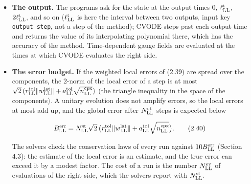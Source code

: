 \documentclass[
  10pt,
]{article}
\begin{document}
\begin{itemize}
  the sum running over the \(n^{\rm cpx}_{\rm LL}\) complex components
  of the state, with the relative tolerance \(r^{\rm tol}_{\rm LL}\) and
  the absolute tolerance \(a^{\rm tol}_{\rm LL}\) (the solvers use
  \(10^{-12}\) and \(10^{-14}\); input keys \texttt{rtol},
  \texttt{atol}). A rejected step is repeated with a smaller
  \(h^{\rm CV}_{\rm LL}\); after every step CVODE chooses the size and
  the order of the next one, as large as the test allows. The factor 2
  appears because SUNDIALS integrates real systems: the real and the
  imaginary part of every component are two real unknowns. Both carry
  the same weight
  \(1/(r^{\rm tol}_{\rm LL}\lvert w^{\rm cmp}_{\rm LL}\rvert+a^{\rm tol}_{\rm LL})\),
  set by the modulus of the component, which the module
  \texttt{t2core::cvode} gives to CVODE as its own error-weight
  function. The standard weights of CVODE, which take every real unknown
  separately, would measure the error of the real part relative to the
  real part, which passes through zero twice in every period of the
  oscillation \(\exp(-iE^{\rm qp}_{{\rm LL},n}x^0_{\rm LL})\), and would
  force needlessly small steps.
\item
  \textbf{The output.} The programs ask for the state at the output
  times \(0\), \(\ell^{\rm t}_{\rm LL}\), \(2\ell^{\rm t}_{\rm LL}\),
  and so on (\(\ell^{\rm t}_{\rm LL}\) is here the interval between two
  outputs, input key \texttt{output\_step}, not a step of the method);
  CVODE steps past each output time and returns the value of its
  interpolating polynomial there, which has the accuracy of the method.
  Time-dependent gauge fields are evaluated at the times at which CVODE
  evaluates the right side.
\item
  \textbf{The error budget.} If the weighted local errors of (2.39) are
  spread over the components, the 2-norm of the local error of a step is
  at most
  \(\sqrt2\,(r^{\rm tol}_{\rm LL}\lVert w^{\rm lat}_{\rm LL}\rVert+a^{\rm tol}_{\rm LL}\sqrt{n^{\rm cpx}_{\rm LL}})\)
  (the triangle inequality in the space of the components). A unitary
  evolution does not amplify errors, so the local errors at most add up,
  and the global error after \(N^{\rm st}_{\rm LL}\) steps is expected
  below

  \[B^{\rm err}_{\rm LL}=N^{\rm st}_{\rm LL}\sqrt2\,\big(r^{\rm tol}_{\rm LL}\lVert w^{\rm lat}_{\rm LL}\rVert+a^{\rm tol}_{\rm LL}\sqrt{n^{\rm cpx}_{\rm LL}}\big).\tag{2.40}\]

  The solvers check the conservation laws of every run against
  \(10B^{\rm err}_{\rm LL}\) (Section 4.3): the estimate of the local
  error is an estimate, and the true error can exceed it by a modest
  factor. The cost of a run is the number \(N^{\rm ev}_{\rm LL}\) of
  evaluations of the right side, which the solvers report with
  \(N^{\rm st}_{\rm LL}\).
\end{itemize}
\end{document}
